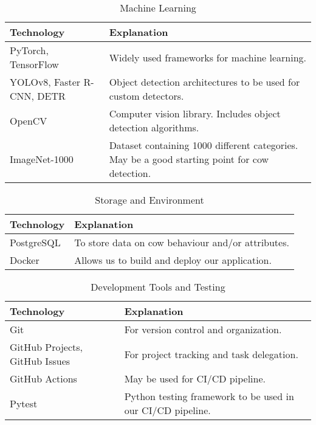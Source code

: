 \documentclass{article}
\begin{document}
\begin{table}[!htbp]
\caption{Machine Learning} \label{TblMachineLearning}
\begin{tabularx}{\textwidth}{p{3.5cm}p{7cm}}
\toprule
\textbf{Technology} & \textbf{Explanation}\\
\midrule
PyTorch, TensorFlow & Widely used frameworks for machine learning.\\
\addlinespace
YOLOv8, Faster R-CNN, DETR & Object detection architectures to be used for custom detectors.\\
\addlinespace
OpenCV & Computer vision library. Includes object detection algorithms.\\
\addlinespace
ImageNet-1000 & Dataset containing 1000 different categories. May be a good starting point for cow detection.\\
\bottomrule
\end{tabularx}
\end{table}

\begin{table}[!htbp]
\caption{Storage and Environment} \label{TblStorageAndEnvironment}
\begin{tabularx}{\textwidth}{p{3cm}p{7.5cm}}
\toprule
\textbf{Technology} & \textbf{Explanation}\\
\midrule
PostgreSQL & To store data on cow behaviour and/or attributes.\\
\addlinespace
Docker & Allows us to build and deploy our application.\\
\bottomrule
\end{tabularx}
\end{table}

\begin{table}[!htbp]
\caption{Development Tools and Testing} \label{TblDevelopmentToolsAndTesting}
\begin{tabularx}{\textwidth}{p{3cm}p{7cm}}
\toprule
\textbf{Technology} & \textbf{Explanation}\\
\midrule
Git & For version control and organization.\\
\addlinespace
GitHub Projects, GitHub Issues & For project tracking and task delegation.\\
\addlinespace
GitHub Actions & May be used for CI/CD pipeline.\\
\addlinespace
Pytest & Python testing framework to be used in our CI/CD pipeline.\\
\bottomrule
\end{tabularx}
\end{table}
\end{document}
